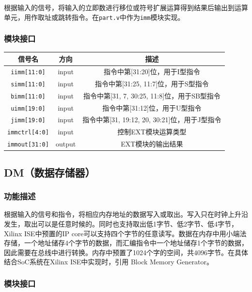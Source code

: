 \documentclass[UTF8,a4paper,autofakebold,15pt]{ctexart}
\begin{document}
根据输入的信号，将输入的立即数进行移位或符号扩展运算得到结果后输出到运算单元，用作取址或跳转指令。在{\tt part.v}中作为{\tt imm}模块实现。

\subsubsection{模块接口}

\begin{center}
	\begin{tabular}{|c|c|c|}
		\hline
		信号名&方向&描述\\
		\hline
		{\tt iimm[11:0]}&input&指令中第[31:20]位，用于I型指令\\
		\hline
		{\tt simm[11:0]}&input&指令中第[31:25, 11:7]位，用于S型指令\\
		\hline
		{\tt bimm[11:0]}&input&指令中第[31, 7, 30:25, 11:8]位，用于SB型指令\\
		\hline
		{\tt uimm[19:0]}&input&指令中第[31:12]位，用于U型指令\\
		\hline
		{\tt jimm[19:0]}&input&指令中第[31, 19:12, 20, 30:21]位，用于J型指令\\
		\hline
		{\tt immctrl[4:0]}&input&控制EXT模块运算类型\\
		\hline
		{\tt immout[31:0]}&output&EXT模块的输出结果\\
		\hline
	\end{tabular}
	
\end{center}

\subsection{DM（数据存储器）}

\subsubsection{功能描述}

根据输入的信号和指令，将相应内存地址的数据写入或取出。写入只在时钟上升沿发生，取出可以是任意时候的。同时也支持取出低1字节、低2字节、低4字节，Xilinx ISE中预置的IP core可以支持四个字节的任意读写。数据在内存中用小端法存储，一个地址储存4个字节的数据，而汇编指令中一个地址储存1个字节的数据，因此需要在总线中进行转换。内存中预置了1024个字的空间，共4096字节。在具体结合SoC系统在Xilinx ISE中实现时，引用 Block Memory Generator。

\subsubsection{模块接口}
\end{document}
